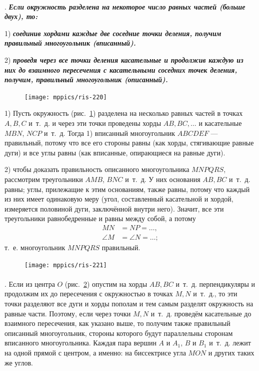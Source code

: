 \documentclass[oneside]{book}
\begin{document}
\paragraph{}\label{1938/213}
.
\textbf{\emph{Если окружность разделена на некоторое число равных частей (больше двух), то:}}

1) \textbf{\emph{соединив хордами каждые две соседние точки деления, получим правильный многоугольник (вписанный).}}

2) \textbf{\emph{проведя через все точки деления касательные и продолжив каждую из них до взаимного пересечения с касательными соседних точек деления, получим, правильный многоугольник (описанный).}}

\begin{figure}
\centering
\texttt{[image: mppics/ris-220]}
\caption{}\label{1938/ris-220}
\end{figure}

1) Пусть окружность (рис.~\ref{1938/ris-220}) разделена на несколько равных частей в точках $A, B, C$ и~т.~д.
и через эти точки проведены хорды $AB, BC,\dots$
и касательные $MBN$, $NCP$ и~т.~д.
Тогда 1) вписанный многоугольник $ABCDEF$ — правильный, потому что все его стороны равны (как хорды, стягивающие равные дуги) и все углы равны (как вписанные, опирающиеся на равные дуги).

2) чтобы доказать правильность описанного многоугольника $MNPQRS$, рассмотрим треугольники $AMB$, $BNC$ и~т.~д.
У них основания $AB, BC$ и~т.~д.
равны;
углы, прилежащие к этим основаниям, также равны, потому что каждый из них имеет одинаковую меру (угол, составленный касательной и хордой, измеряется половиной дуги, заключённой внутри него).
Значит, все эти треугольники равнобедренные и равны между собой, а потому 
\begin{align*}
MN&=NP=\dots,
\\
\angle M&=\angle N=\dots;
\end{align*}
т.~е. многоугольник $MNPQRS$ правильный.

\begin{figure}
\centering
\texttt{[image: mppics/ris-221]}
\caption{}\label{1938/ris-221}
\end{figure}

\paragraph{}\label{1938/214} %
\mbox{.}
Если из центра $O$ (рис.~\ref{1938/ris-221}) опустим на хорды $AB, BC$ и~т.~д.
перпендикуляры и продолжим их до пересечения с окружностью в точках $M, N$ и~т.~д., то эти точки разделяют все дуги и хорды пополам и тем самым разделят окружность на равные части.
Поэтому, если через точки $M, N$ и~т.~д.
проведём касательные до взаимного пересечения, как указано выше, то получим также правильный описанный многоугольник, стороны которого будут параллельны сторонам вписанного многоугольника.
Каждая пара вершин $A$ и $A_1$, $B$ и $B_1$ и~т.~д.
лежит на одной прямой с центром, а именно:
на биссектрисе угла $MON$ и других таких же углов.
\end{document}
